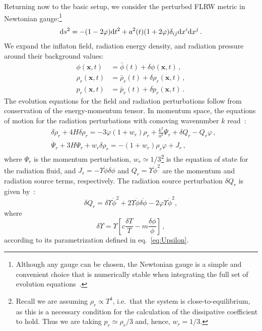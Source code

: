 \documentclass[a4paper,11pt]{article}
\begin{document}
Returning now to the basic setup, we consider the perturbed FLRW metric in Newtonian gauge:\footnote{Although any gauge can be chosen, the Newtonian gauge is a simple and convenient choice that is numerically stable when integrating the full set of evolution equations~\cite{Das:2020xmh}.}
\begin{equation}
    {\rm d}s^2 = -(1 -2\varphi){\rm d}t^2 + a^2(t)(1+2\varphi)\delta_{ij}{\rm d}x^{i}{\rm d}x^{j}\,.
    \label{eq:2.1}
\end{equation}
We expand the inflaton field, radiation energy density, and radiation pressure around their background values:
\begin{align}
    \phi(\mathbf{x}, t) & =\bar{\phi}(t)+\delta \phi(\mathbf{x}, t)\,, \\
    \rho_r(\mathbf{x}, t) & =\bar{\rho}_r(t)+\delta \rho_r(\mathbf{x}, t)\,, \\
    p_r(\mathbf{x}, t) & =\bar{p}_r(t)+\delta p_r(\mathbf{x}, t)\,.
\end{align}
The evolution equations for the field and radiation perturbations follow from conservation of the energy-momentum tensor. In momentum space, the equations of motion for the radiation perturbations with comoving wavenumber $k$ read~\cite{Bastero-Gil:2011rva}:
\begin{align}
    & \delta \dot{\rho}_r+4 H \delta \rho_r=-3\dot{\varphi}\left(1+w_r\right) \rho_r +\frac{k^2}{a^2} \Psi_r+\delta Q_r-Q_r \varphi\,, \label{eq:2.2}\\
    &\dot{\Psi}_r+3 H \Psi_r+w_r \delta \rho_r=-\left(1+w_r\right) \rho_r \varphi+J_r\,, \label{eq:2.3}
\end{align}
where $\Psi_r$ is the momentum perturbation, $w_r\simeq 1/3$\footnote{Recall we are assuming $\rho_r\propto T^4$, i.e.\ that the system is close-to-equilibrium, as this is a necessary condition for the calculation of the dissipative coefficient to hold. Thus we are taking $p_r\simeq \rho_r/3 $ and, hence, $w_r = 1/3$.} is the equation of state for the radiation fluid, and $J_r = -\Upsilon\dot{\phi}\delta\phi$ and $Q_r = \Upsilon \dot{\phi}^2$ are the momentum and radiation source terms, respectively. The radiation source perturbation $\delta Q_r$ is given by~\cite{Bastero-Gil:2011rva}:
\begin{equation}
    \delta Q_r=\delta \Upsilon \dot{\phi}^2+2 \Upsilon \dot{\phi} \delta \dot{\phi}-2 \varphi \Upsilon \dot{\phi}^2, \label{eq:2.4}
\end{equation}
where
\begin{equation}
    \delta \Upsilon=\Upsilon\left[c \frac{\delta T}{T}-m \frac{\delta \phi}{\phi}\right]\,, \label{eq:2.5}
\end{equation}
according to its parametrization defined in eq.~\eqref{eq:Upsilon}.
\end{document}
